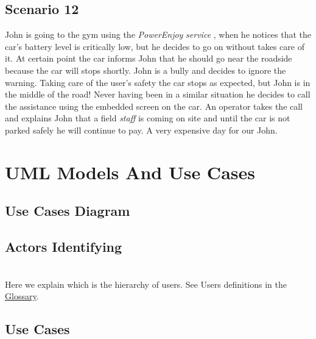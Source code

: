 \documentclass[english]{article}
\newcommand{\powerenjoy}{\textit{PowerEnjoy }}
\newcommand{\staff}{\textit{staff }}
\newcommand{\service}{\textit{service }}
\begin{document}
	\subsection{Scenario 12}
		John is going to the gym using the \powerenjoy \service, when he notices that the car's battery level is critically low, but he decides to go on without takes care of it. At certain point the car informs John that he should go near the roadside because the car will stops shortly. John is a bully and decides to ignore the warning. Taking care of the user's safety the car stops as expected, but John is in the middle of the road! Never having been in a similar situation he decides to call the assistance using the embedded screen on the car. An operator takes the call and explains John that a field \staff is coming on site and until the car is not parked safely he will continue to pay. A very expensive day for our John.		
	
\section{UML Models And Use Cases}
	\subsection{Use Cases Diagram}
	\noindent



	\subsection{Actors Identifying}
		\noindent
		\\
	Here we explain which is the hierarchy of users. See Users definitions in the \hyperref[sec:Glossary]{Glossary}.  
	\subsection{Use Cases}
\end{document}
